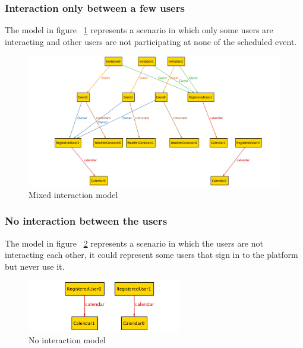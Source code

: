 \subsubsection{Interaction only between a few users}
The model in figure ~\ref{fig:mixint} represents a scenario in which only some users are interacting and other users are not participating at none of the scheduled event.
\begin{center}
 \begin{figure}[H]
    \includegraphics[width=1.1\textwidth,height=0.7\textwidth]{../Alloy/mixInt.png}
    \caption{Mixed interaction model}
     \label{fig:mixint}
     \end{figure}
   \end{center} 
\subsubsection{No interaction between the users}
The model in figure ~\ref{fig:noint} represents a scenario in which the users are not interacting each other, it could represent some users that sign in to the platform but never use it.
\begin{center}
 \begin{figure}[H]
    \includegraphics[width=0.6\textwidth]{../Alloy/noInteration.png}
    \caption{No interaction model}
     \label{fig:noint}
     \end{figure}
   \end{center} 









